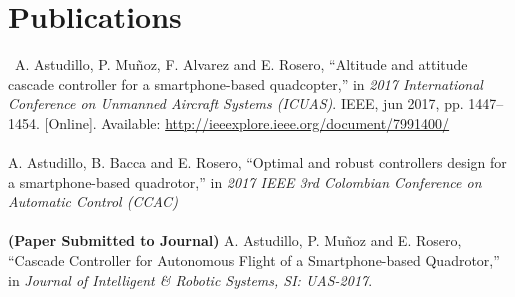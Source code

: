 \chapter*{Publications} \label{publications}

\
A. Astudillo, P. Muñoz, F. Alvarez and E. Rosero, “Altitude and attitude cascade controller for a smartphone-based quadcopter,” in \textit{2017 International Conference on Unmanned Aircraft Systems (ICUAS)}. IEEE, jun 2017, pp. 1447–1454. [Online]. Available: \url{http://ieeexplore.ieee.org/document/7991400/}
\\\\
A. Astudillo, B. Bacca and E. Rosero, “Optimal and robust controllers design for a smartphone-based quadrotor,” in \textit{2017 IEEE 3rd Colombian Conference on Automatic Control (CCAC)}
\\\\
\textbf{(Paper Submitted to Journal)} A. Astudillo, P. Muñoz and E. Rosero, “Cascade Controller for Autonomous Flight of a Smartphone-based Quadrotor,” in \textit{Journal of Intelligent \& Robotic Systems, SI: UAS-2017}.
